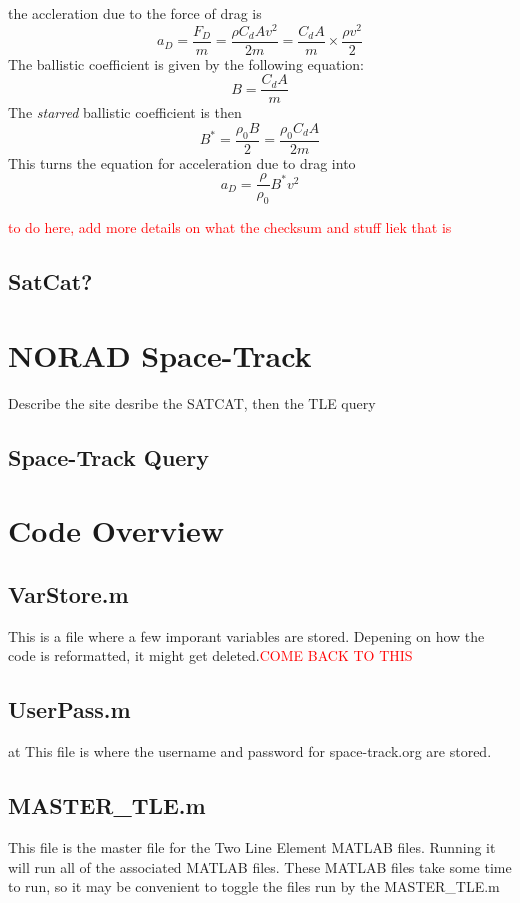 \documentclass[12pt]{report}
\begin{document}
	the accleration due to the force of drag is 
	\begin{equation}
	a_D=\frac{F_D}{m}=\frac{\rho C_d A v^2}{2m}=\frac{ C_d A}{m}\times\frac{\rho v^2}{2}
	\end{equation}
	The ballistic coefficient is given by the following equation:
	\begin{equation}
	B=\frac{ C_d A}{m}
	\end{equation}
	The \textit{starred} ballistic coefficient is then
	\begin{equation}
	B^{*} = \frac{\rho_0 B}{2}=\frac{\rho_0 C_d A}{2m}
	\end{equation}
	This turns the equation for acceleration due to drag into \cite{celestrak_TLE_FAQ}\cite{castor2_BSTAR}
	\begin{equation}
	a_D=\frac{\rho}{\rho_0}B^{*} v^2
	\end{equation}
	
	\textcolor{red}{to do here, add more details on what the checksum and stuff liek that is}
	\subsection{SatCat?}
	\section{NORAD Space-Track}	
	Describe the site
	desribe the SATCAT, then the TLE query
	
	
	\subsection{Space-Track Query}
	
	\section{Code Overview}
		\subsection{VarStore.m}
		This is a file where a few imporant variables are stored. Depening on how the code is reformatted, it might get deleted.\textcolor{red}{COME BACK TO THIS}
		\subsection{UserPass.m}at
		This file is where the username and password for space-track.org are stored. 
		\subsection{MASTER\_TLE.m}
		This file is the master file for the Two Line Element MATLAB files. Running it will run all of the associated MATLAB files. These MATLAB files take some time to run, so it may be convenient to toggle the files run by the MASTER\_TLE.m
\end{document}
